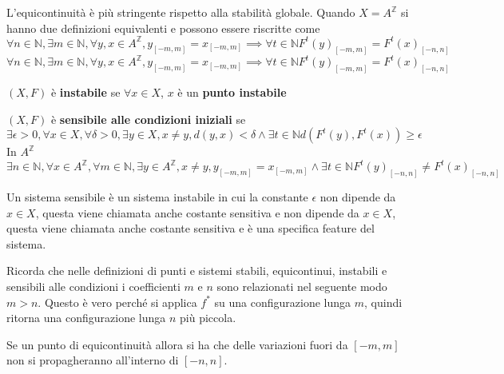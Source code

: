\begin{nota}
    L'equicontinuità è più stringente rispetto alla stabilità globale. Quando $X=A^\mathbb{Z}$
    si hanno due definizioni equivalenti e possono essere riscritte come
    $$\forall n\in \mathbb{N} ,\exists m\in \mathbb{N} , \forall y,x\in A^\mathbb{Z}, y_{[-m,m]} = x_{[-m,m]} \implies \forall t\in \mathbb{N} F^t(y)_{[-m,m]}=F^t(x)_{[-n,n]}$$
    $$\forall n\in \mathbb{N} ,\exists m\in \mathbb{N} , \forall y,x\in A^\mathbb{Z}, y_{[-m,m]} = x_{[-m,m]} \implies \forall t\in \mathbb{N} F^t(y)_{[-m,m]}=F^t(x)_{[-n,n]}$$
\end{nota}
\begin{definizione} 
\begin{definizione} 
    $(X,F)$ è \textbf{instabile} se $\forall x \in X$, $x$ è un \textbf{punto instabile}
\end{definizione}

\begin{definizione} 
    $(X,F)$ è \textbf{sensibile alle condizioni iniziali} se
    $$\exists \epsilon > 0,\forall x \in X, \forall \delta > 0, \exists y\in X,x \ne y, d(y,x) < \delta \land \exists t\in \mathbb{N} d(F^t(y),F^t(x))\ge \epsilon$$
    In $A^\mathbb{Z}$
    $$\exists n\in \mathbb{N} ,\forall x \in A^\mathbb{Z}, \forall m\in \mathbb{N} , \exists y\in A^\mathbb{Z},x \ne y, y_{[-m,m]} = x_{[-m,m]} \land \exists t\in \mathbb{N} F^t(y)_{[-n,n]}\ne F^t(x)_{[-n,n]}$$
\end{definizione}
\end{definizione}
\begin{nota}
    Un sistema sensibile è un sistema instabile in cui la constante $\epsilon$
    non dipende da $x\in X$, questa viene chiamata anche costante sensitiva e
    non dipende da $x\in X$, questa viene chiamata anche costante sensitiva e
    è una specifica feature del sistema.
\end{nota}
\begin{nota}
    Ricorda che nelle definizioni di punti e sistemi stabili, equicontinui, instabili e sensibili
    alle condizioni i coefficienti $m$ e $n$ sono relazionati nel seguente modo $m> n$.
    Questo è vero perché si applica $f^\ast$ su una configurazione lunga $m$, quindi
    ritorna una configurazione lunga $n$ più piccola.
\end{nota}

Se un punto di equicontinuità allora si ha che delle variazioni fuori da $[-m,m]$
non si propagheranno all'interno di $[-n,n]$.

